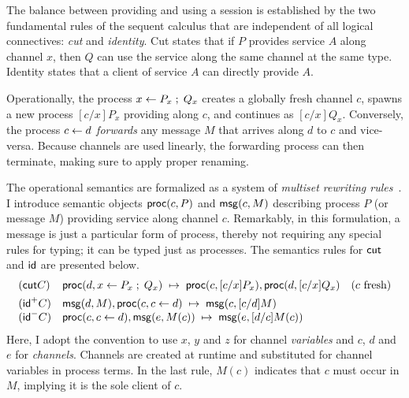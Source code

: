 The balance between providing and using a session is established by the
two fundamental rules of the sequent calculus that are independent of all
logical connectives: \emph{cut} and \emph{identity}. Cut states that if
$P$ provides service $A$ along channel $x$, then $Q$ can use the service
along the same channel at the same type. Identity states that a client of
service $A$ can directly provide $A$.
Operationally, the process $x \leftarrow P_x \; ; \; Q_x$ creates a globally fresh
channel $c$, spawns a new process $[c/x]P_x$ providing along $c$, and
continues as $[c/x]Q_x$. Conversely, the process $c \leftarrow d$
\emph{forwards} any message $M$ that arrives along $d$ to $c$ and
vice-versa. Because channels are used linearly, the forwarding process
can then terminate, making sure to apply proper renaming.

The operational semantics are formalized as a system of \emph{multiset
rewriting rules}~\cite{Cervesato2009SSOS}. I introduce semantic objects
$\mathsf{proc}(c, P)$ and $\mathsf{msg}(c, M)$ describing process $P$ (or message $M$)
providing service along channel $c$. Remarkably, in this formulation,
a message is just a particular form of process, thereby not requiring any
special rules for typing; it can be typed just as processes. The semantics
rules for $\mathsf{cut}$ and $\mathsf{id}$ are presented below.
\[
\begin{array}{lll}
(\mathsf{cut}C) & \mathsf{proc}(d, x \leftarrow P_x \; ; \; Q_x) \; \mapsto \; \mathsf{proc}(c, [c/x]P_x),
\mathsf{proc}(d, [c/x]Q_x) & (c \text{ fresh}) \\[1ex]
(\mathsf{id}^+C) & \mathsf{msg}(d, M), \mathsf{proc}(c, c \leftarrow d) \; \mapsto \;
\mathsf{msg}(c, [c/d]M) \\
(\mathsf{id}^-C) & \mathsf{proc}(c, c \leftarrow d), \mathsf{msg}(e, M(c)) \; \mapsto \;
\mathsf{msg}(e, [d/c]M(c))
\end{array}
\]
Here, I adopt the convention to use $x$, $y$ and $z$ for channel
\emph{variables} and $c$, $d$ and $e$ for \emph{channels}. Channels are
created at runtime and substituted for channel variables in process terms.
In the last rule, $M(c)$ indicates that $c$ must occur in $M$, implying
it is the sole client of $c$.

